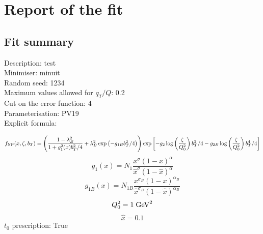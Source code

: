 \documentclass[
]{article}
\date{}
\begin{document}
\hypertarget{report-of-the-fit}{%
\section{Report of the fit}\label{report-of-the-fit}}

\hypertarget{fit-summary}{%
\subsection{Fit summary}\label{fit-summary}}

Description: test\\
Minimiser: minuit\\
Random seed: 1234\\
Maximum values allowed for \(q_T / Q\): 0.2\\
Cut on the error function: 4\\
Parameterisation: PV19\\
Explicit formula:

\[f_{\rm NP}(x,\zeta, b_T)= \Biggl(
\frac{1-\lambda_B^2}{1 + g_1^2(x) b_T^2/4} + \lambda_B^2 \exp \left(-g_{1B} b_T^2 /4 \right)\Biggr) \exp\left[- g_2 \log\left(\frac{\zeta}{Q_0^2}\right) b_T^2/4 - g_{2B} \log\left(\frac{\zeta}{Q_0^2}\right) b_T^4/4 \right]\]\[g_1(x) = N_1 \frac{x^{\sigma}(1-x)^{\alpha}}{\hat{x}^{\sigma}(1-\hat{x})^{\alpha}}\]\[g_{1B}(x) = N_{1B} \frac{x^{\sigma_B}(1-x)^{\alpha_B}}{\hat{x}^{\sigma_B}(1-\hat{x})^{\alpha_B}}\]\[Q_0^2 = 1\;{\rm GeV}^2\]\[\hat{x} = 0.1\]
\(t_0\) prescription: True
\end{document}
